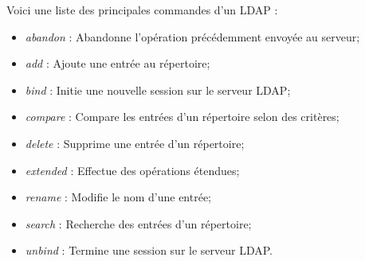 Voici une liste des principales commandes d'un LDAP :
\begin{itemize}
    \item \textit{abandon} : Abandonne l'opération précédemment envoyée au serveur;
    \item \textit{add} : Ajoute une entrée au répertoire;
    \item \textit{bind} : Initie une nouvelle session sur le serveur LDAP;
    \item \textit{compare} : Compare les entrées d'un répertoire selon des critères;
    \item \textit{delete} : Supprime une entrée d'un répertoire;
    \item \textit{extended} : Effectue des opérations étendues;
    \item \textit{rename} : Modifie le nom d'une entrée;
    \item \textit{search} : Recherche des entrées d'un répertoire;
    \item \textit{unbind} : Termine une session sur le serveur LDAP.
\end{itemize}
